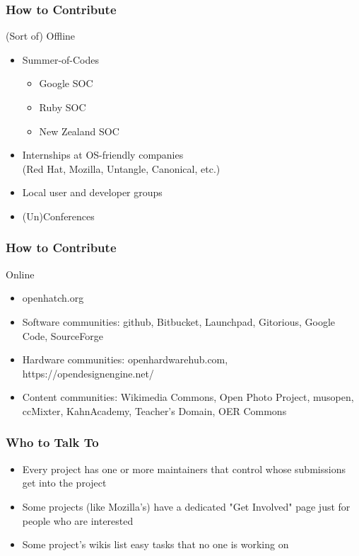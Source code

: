 \documentclass{beamer}
\begin{document}
\begin{frame}
  \frametitle{How to Contribute}
  \begin{LARGE} (Sort of) Offline \end{LARGE}
  \begin{itemize}
  \item Summer-of-Codes
    \begin{itemize}
    \item Google SOC
    \item Ruby SOC
    \item New Zealand SOC
    \end{itemize}
  \item Internships at OS-friendly companies \\ (Red Hat, Mozilla, Untangle, Canonical, etc.)
  \item Local user and developer groups
  \item (Un)Conferences
  \end{itemize}
\end{frame}

\begin{frame}
  \frametitle{How to Contribute}
  \begin{LARGE} Online \end{LARGE}
  \begin{itemize}
  \item openhatch.org
  \item Software communities: github, Bitbucket, Launchpad, Gitorious, Google Code, SourceForge
  \item Hardware communities: openhardwarehub.com, https://opendesignengine.net/
  \item Content communities: Wikimedia Commons, Open Photo Project, musopen, ccMixter, KahnAcademy, Teacher's Domain, OER Commons
  \end{itemize}
\end{frame}

\begin{frame}
  \frametitle{Who to Talk To}
  \begin{itemize}
  \item Every project has one or more \textcolor{beamer@myblue}{maintainers} that control whose submissions get into the project
  \item Some projects (like Mozilla's) have a dedicated "Get Involved" page just for people who are interested
  \item Some project's wikis list easy tasks that no one is working on
  \end{itemize}

\end{frame}
\end{document}
